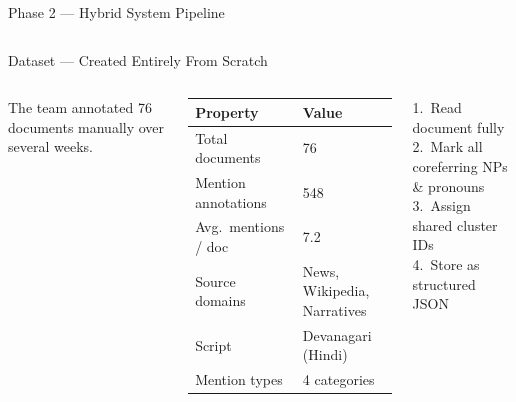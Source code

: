 \documentclass[aspectratio=169]{beamer}
\begin{document}
\begin{frame}{Phase 2 — Hybrid System Pipeline}
\begin{columns}[T]
  \end{columns}
\end{frame}

\begin{frame}{Dataset — Created Entirely From Scratch}
  \begin{columns}[T]
      \begin{tcolorbox}[wbox={No Public Hindi Coref Dataset Existed!}]
        \small
        The team annotated 76 documents manually over several weeks.
      \end{tcolorbox}

      \vspace{6pt}
      \small
      \renewcommand{\arraystretch}{1.4}
      \begin{tabular}{@{}ll@{}}
        \toprule
        \textbf{Property} & \textbf{Value}\\
        \midrule
        Total documents & 76\\
        Mention annotations & 548\\
        Avg.\ mentions / doc & 7.2\\
        Source domains & News, Wikipedia, Narratives\\
        Script & Devanagari (Hindi)\\
        Mention types & 4 categories\\
        \bottomrule
      \end{tabular}

      \vspace{6pt}
      \begin{tcolorbox}[nbox={Annotation Steps}]
        \small
        1.\ Read document fully\\
        2.\ Mark all coreferring NPs \& pronouns\\
        3.\ Assign shared cluster IDs\\
        4.\ Store as structured JSON
      \end{tcolorbox}


\end{columns}
\end{frame}
\end{document}
